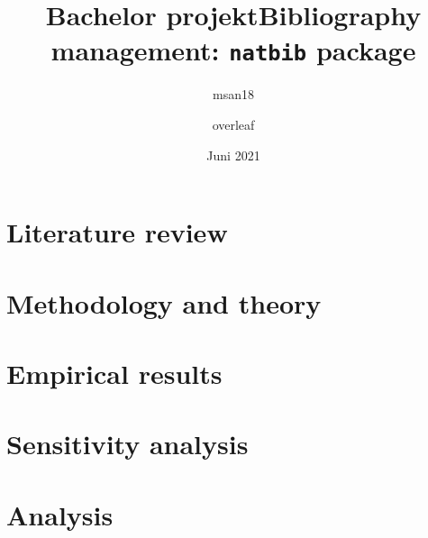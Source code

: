 \documentclass[danish ,a4paper,12pt]{article}
\title{Bachelor projekt}
\author{msan18 }
\date{Juni 2021}
\title{Bibliography management: \texttt{natbib} package}
\author{overleaf}
\date{}
\begin{document}
\linespread{1.5}

\frontmatter






\tableofcontents*	
\newpage


\renewcommand{\cleardoublepage}{\newpage}
\mainmatter


\vspace{1.5 cm}
\selectfont




\pagebreak
\section{Literature review} \label{lit_rev}

\pagebreak

\section{Methodology and theory} \label{sec:method}

\pagebreak

\section{Empirical results} \label{sec:analysis}

\pagebreak

\section{Sensitivity analysis} \label{sec:sensitivity}

\pagebreak

\section{Analysis} \label{results}

\pagebreak
\end{document}
